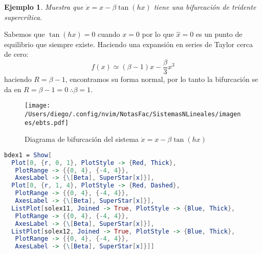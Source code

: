 \documentclass[12pt,letterpaper]{article}
\newtheorem{ejemplo}{Ejemplo}
\begin{document}
\begin{enumerate}
    \begin{ejemplo}
      Muestra que $\dot{x}=x-\beta\tan(hx) $ tiene una bifurcación de tridente supercrítica. 
    \end{ejemplo}
    Sabemos que $\tan(hx)=0$ cuando $x=0$ por lo que $\hat{x}=0$ es un punto de equilibrio que siempre existe. Haciendo una expansión en series de Taylor cerca de cero:
    $$
    f(x) \simeq (\beta-1)x - \frac{\beta}{3}x^3
    $$
    haciendo $R=\beta-1$, encontramos su forma normal, por lo tanto la bifurcación se da en $R=\beta-1=0 \ \therefore \beta=1$.

    \begin{figure}[htpb]
      \centering
      \texttt{[image: /Users/diego/.config/nvim/NotasFac/SistemasNLineales/imagenes/ebts.pdf]}
      \caption{Diagrama de bifurcación del sistema $\dot{x}=x-\beta\tan(hx)$}
    \end{figure}

    \begin{tcolorbox}[colback=Orange!10, colframe=Orange,title=Código figura 6]
    \begin{lstlisting}[language=Mathematica]
    bdex1 = Show[
  Plot[0, {r, 0, 1}, PlotStyle -> {Red, Thick}, 
   PlotRange -> {{0, 4}, {-4, 4}}, 
   AxesLabel -> {\[Beta], SuperStar[x]}], 
  Plot[0, {r, 1, 4}, PlotStyle -> {Red, Dashed}, 
   PlotRange -> {{0, 4}, {-4, 4}}, 
   AxesLabel -> {\[Beta], SuperStar[x]}], 
  ListPlot[solex11, Joined -> True, PlotStyle -> {Blue, Thick}, 
   PlotRange -> {{0, 4}, {-4, 4}}, 
   AxesLabel -> {\[Beta], SuperStar[x]}], 
  ListPlot[solex12, Joined -> True, PlotStyle -> {Blue, Thick}, 
   PlotRange -> {{0, 4}, {-4, 4}}, 
   AxesLabel -> {\[Beta], SuperStar[x]}]]
    \end{lstlisting}  
    \end{tcolorbox}
    
\end{enumerate}
\end{document}
